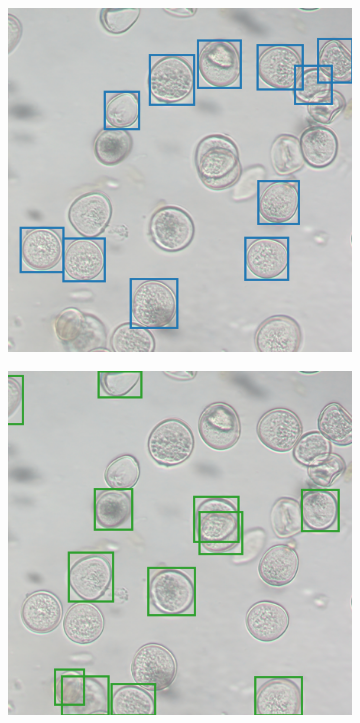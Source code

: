 \begin{figure}[htbp]
  \centering
  \begin{subfigure}[t]{0.35\textwidth}
    \includegraphics[width=\textwidth]{figs/results/sharpness/Snap-242-sharp.png}
    \label{fig:results-sharpness-sharp}
  \end{subfigure}
  \hspace*{0.4em}
  \begin{subfigure}[t]{0.35\textwidth}
    \includegraphics[width=\textwidth]{figs/results/sharpness/Snap-242-blurry.png}

\end{subfigure}
\end{figure}
